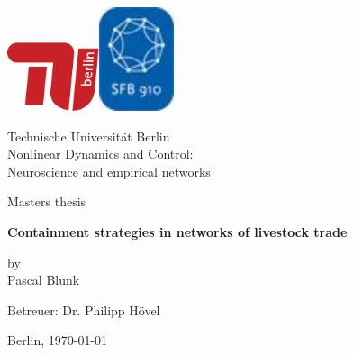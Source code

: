 \begin{titlepage}
\centerline{\includegraphics[width=2.7cm]{tu.pdf}\hfill\includegraphics[width=2.2cm]{sfb910.jpg}}
\vspace*{1cm}
\begin{center}
\large
Technische Universität Berlin\\
Nonlinear Dynamics and Control: \\ Neuroscience and empirical networks
\end{center}
\vspace*{1cm}
\centerline{Masters thesis}
\vspace*{1cm}
\begin{center}
\LARGE{\textbf{Containment strategies in networks of livestock trade}}
\end{center}
\medskip
\begin{center}
by\\
Pascal Blunk
\end{center}
\vspace*{2cm}
\centerline{Betreuer: Dr. Philipp Hövel}
\vspace*{5cm}
\centerline{Berlin, \today}
\thispagestyle{empty}
\cleardoublepage
\end{titlepage}